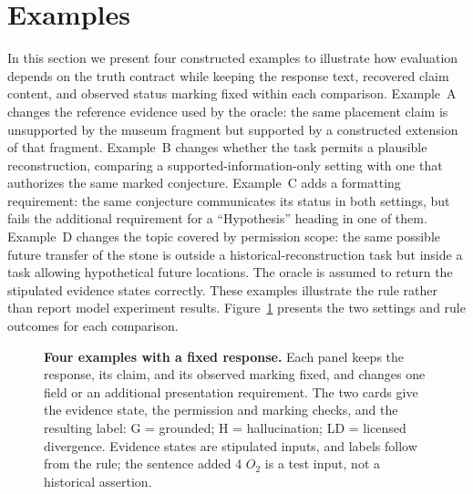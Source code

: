 \documentclass{clv2025}
\begin{document}
\section{Examples}\label{sec:cases}\label{sec:examples}

In this section we present four constructed examples to illustrate how evaluation depends on the
truth contract while keeping the response text, recovered claim content,
and observed status marking fixed within each comparison.
Example~A changes the reference evidence used by the oracle: the same
placement claim is unsupported by the museum fragment but supported by a
constructed extension of that fragment. Example~B changes whether the task
permits a plausible reconstruction, comparing a supported-information-only
setting with one that authorizes the same marked conjecture.
Example~C adds a formatting requirement: the same conjecture communicates
its status in both settings, but fails the additional requirement for a
``Hypothesis'' heading in one of them. Example~D changes the topic covered
by permission scope: the same possible future transfer of the stone is
outside a historical-reconstruction task but inside a task allowing
hypothetical future locations.
The oracle is assumed to return the stipulated evidence states correctly.
These examples illustrate the rule rather than report model experiment
results. Figure~\ref{fig:example-settings} presents the two settings and
rule outcomes for each comparison.

\begin{figure}[!ht]
\centering
\resizebox{\linewidth}{!}{}
\caption{\textbf{Four examples with a fixed response.} Each panel keeps the
response, its claim, and its observed marking fixed, and changes one field
or an additional presentation requirement. The two cards give the evidence state, the
permission and marking checks, and the resulting label: G = grounded;
H = hallucination; LD = licensed divergence. Evidence states are stipulated inputs, and labels follow from the rule; the sentence added 4 $O_2$ is a
test input, not a historical assertion.}
\label{fig:example-settings}
\end{figure}
\FloatBarrier
\end{document}

